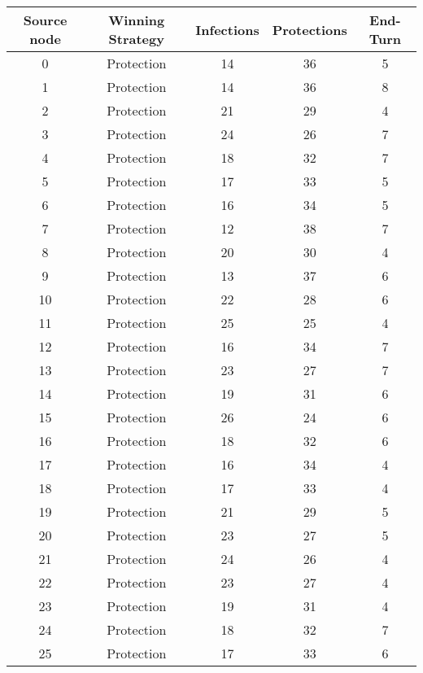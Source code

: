 \documentclass[results.tex]{subfiles}
\begin{document}
\begin{center}
  \begin{tabular}{| c || c | c | c | c |}
    \hline
    {\bfseries Source node} & {\bfseries Winning Strategy} & {\bfseries Infections} & {\bfseries Protections} & {\bfseries End-Turn} \\  %
    \hline\hline
    0 & Protection & 14 & 36 & 5 \\ 
    \hline
    1 & Protection & 14 & 36 & 8 \\ 
    \hline
    2 & Protection & 21 & 29 & 4 \\ 
    \hline
    3 & Protection & 24 & 26 & 7 \\ 
    \hline
    4 & Protection & 18 & 32 & 7 \\ 
    \hline
    5 & Protection & 17 & 33 & 5 \\ 
    \hline
    6 & Protection & 16 & 34 & 5 \\ 
    \hline
    7 & Protection & 12 & 38 & 7 \\ 
    \hline
    8 & Protection & 20 & 30 & 4 \\ 
    \hline
    9 & Protection & 13 & 37 & 6 \\ 
    \hline
    10 & Protection & 22 & 28 & 6 \\ 
    \hline
    11 & Protection & 25 & 25 & 4 \\ 
    \hline
    12 & Protection & 16 & 34 & 7 \\ 
    \hline
    13 & Protection & 23 & 27 & 7 \\ 
    \hline
    14 & Protection & 19 & 31 & 6 \\ 
    \hline
    15 & Protection & 26 & 24 & 6 \\ 
    \hline
    16 & Protection & 18 & 32 & 6 \\ 
    \hline
    17 & Protection & 16 & 34 & 4 \\ 
    \hline
    18 & Protection & 17 & 33 & 4 \\ 
    \hline
    19 & Protection & 21 & 29 & 5 \\ 
    \hline
    20 & Protection & 23 & 27 & 5 \\ 
    \hline
    21 & Protection & 24 & 26 & 4 \\ 
    \hline
    22 & Protection & 23 & 27 & 4 \\ 
    \hline
    23 & Protection & 19 & 31 & 4 \\ 
    \hline
    24 & Protection & 18 & 32 & 7 \\ 
    \hline
    25 & Protection & 17 & 33 & 6 \\ 

\end{tabular}
\end{center}
\end{document}
